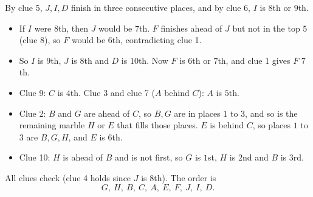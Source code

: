 By clue 5, $J,I,D$ finish in three consecutive places, and by clue 6, $I$ is $8$th or $9$th.

\begin{itemize}
\item If $I$ were $8$th, then $J$ would be $7$th. $F$ finishes ahead of $J$ but not in the top $5$ (clue 8), so $F$ would be $6$th, contradicting clue 1.
\item So $I$ is $9$th, $J$ is $8$th and $D$ is $10$th. Now $F$ is $6$th or $7$th, and clue 1 gives $F$ $7$th.
\item Clue 9: $C$ is $4$th. Clue 3 and clue 7 ($A$ behind $C$): $A$ is $5$th.
\item Clue 2: $B$ and $G$ are ahead of $C$, so $B,G$ are in places $1$ to $3$, and so is the remaining marble $H$ or $E$ that fills those places. $E$ is behind $C$, so places $1$ to $3$ are $B,G,H$, and $E$ is $6$th.
\item Clue 10: $H$ is ahead of $B$ and is not first, so $G$ is $1$st, $H$ is $2$nd and $B$ is $3$rd.
\end{itemize}
All clues check (clue 4 holds since $J$ is $8$th). The order is
\[\boxed{G,\ H,\ B,\ C,\ A,\ E,\ F,\ J,\ I,\ D}.\]
